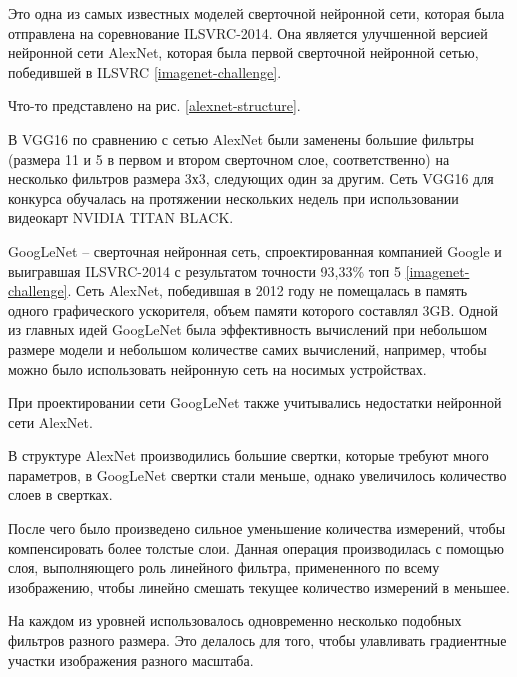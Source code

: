 Это одна из самых известных моделей сверточной нейронной сети, которая была отправлена на соревнование ILSVRC-2014. Она является улучшенной версией нейронной сети AlexNet, которая была первой сверточной нейронной сетью, победившей в ILSVRC \ref{imagenet-challenge}.
 
Что-то представлено на рис. \ref{alexnet-structure}.

В VGG16 по сравнению с сетью AlexNet были заменены большие фильтры (размера 11 и 5 в первом и втором сверточном слое, соответственно) на несколько фильтров размера 3х3, следующих один за другим. Сеть VGG16 для конкурса обучалась на протяжении нескольких недель при использовании видеокарт NVIDIA TITAN BLACK. 


GoogLeNet – сверточная нейронная сеть, спроектированная компанией Google и выигравшая ILSVRC-2014 с результатом точности 93,33\% топ 5 \ref{imagenet-challenge}.
Сеть AlexNet, победившая в 2012 году не помещалась в память одного графического ускорителя, объем памяти которого составлял 3GB. 
Одной из главных идей GoogLeNet была эффективность вычислений при небольшом размере модели и небольшом количестве самих вычислений, например, чтобы можно было использовать нейронную сеть на носимых устройствах.



При проектировании сети GoogLeNet также учитывались недостатки нейронной сети AlexNet. 

В структуре AlexNet производились большие свертки, которые требуют много параметров, в GoogLeNet свертки стали меньше, однако увеличилось количество слоев в свертках.

После чего было произведено сильное уменьшение количества измерений, чтобы компенсировать более толстые слои. 
Данная операция производилась с помощью слоя, выполняющего роль линейного фильтра, примененного по всему изображению, чтобы линейно смешать текущее количество измерений в меньшее.

На каждом из уровней использовалось одновременно несколько подобных фильтров разного размера. 
Это делалось для того, чтобы улавливать градиентные участки изображения разного масштаба.

